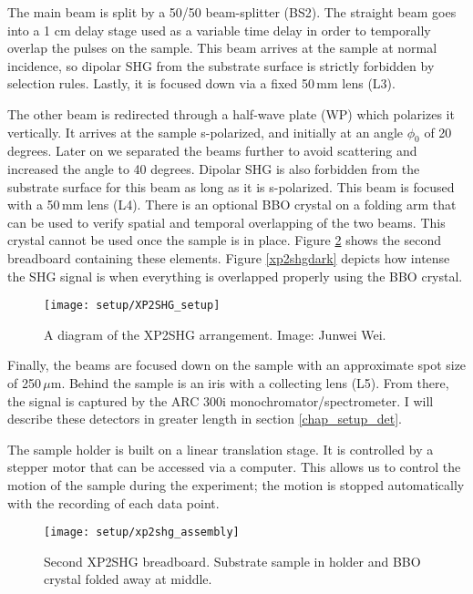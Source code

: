 The main beam is split by a 50/50 beam-splitter (BS2). The straight beam goes into a 1 cm delay stage used as a variable time delay in order to temporally overlap the pulses on the sample. This beam arrives at the sample at normal incidence, so dipolar SHG from the substrate surface is strictly forbidden by selection rules. Lastly, it is focused down via a fixed 50\,mm lens (L3).

The other beam is redirected through a half-wave plate (WP) which polarizes it vertically. It arrives at the sample s-polarized, and initially at an angle $\phi_{0}$ of 20 degrees. Later on we separated the beams further to avoid scattering and increased the angle to 40 degrees. Dipolar SHG is also forbidden from the substrate surface for this beam as long as it is s-polarized. This beam is focused with a 50\,mm lens (L4). There is an optional BBO crystal on a folding arm that can be used to verify spatial and temporal overlapping of the two beams. This crystal cannot be used once the sample is in place. Figure \ref{fig_xp2_assembly} shows the second breadboard containing these elements. Figure \ref{xp2shgdark} depicts how intense the SHG signal is when everything is overlapped properly using the BBO crystal.

\begin{figure}[h]
\centering
\texttt{[image: setup/XP2SHG\_setup]}
\caption[A diagram of the XP2SHG arrangement.]{A diagram of the XP2SHG arrangement. Image: Junwei Wei.\label{fig_xp2}}
\end{figure}

Finally, the beams are focused down on the sample with an approximate spot size of 250\,$\mu$m. Behind the sample is an iris with a collecting lens (L5). From there, the signal is captured by the ARC 300i monochromator/spectrometer. I will describe these detectors in greater length in section \ref{chap_setup_det}.

The sample holder is built on a linear translation stage. It is controlled by a stepper motor that can be accessed via a computer. This allows us to control the motion of the sample during the experiment; the motion is stopped automatically with the recording of each data point.

\begin{figure}[h]
\centering
\texttt{[image: setup/xp2shg\_assembly]}
\caption[Second XP2SHG breadboard.]{Second XP2SHG breadboard. Substrate sample in holder and BBO crystal folded away at middle.\label{fig_xp2_assembly}}
\end{figure}

